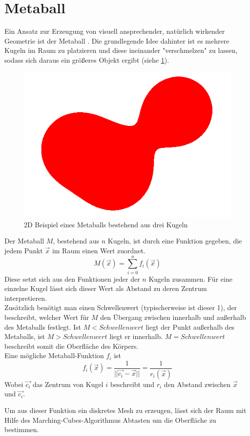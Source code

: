 \section{Metaball} \label{sec:metaball}
Ein Ansatz zur Erzeugung von visuell ansprechender, natürlich wirkender Geometrie ist der Metaball \cite{metaballArticle}.
Die grundlegende Idee dahinter ist es mehrere Kugeln im Raum zu platzieren und diese ineinander "verschmelzen"  zu lassen, sodass sich daraus ein größeres Objekt ergibt (siehe \ref{fig:2dMetaball}).

\begin{figure}[ht]
    \centering
    \includegraphics[width=0.5\linewidth]{chapters/02_Grundlagen/Metaball/metaball_2d}
    \caption{2D Beispiel eines Metaballs bestehend aus drei Kugeln}\label{fig:2dMetaball}
\end{figure}

Der Metaball $M$, bestehend aus $n$ Kugeln, ist durch eine Funktion gegeben, die jedem Punkt $\vec{x}$ im Raum einen Wert zuordnet.
\[M(\vec{x})=\sum_{i=0}^{n}f_i(\vec{x})\]
Diese setzt sich aus den Funktionen jeder der $n$ Kugeln zusammen. Für eine einzelne Kugel lässt sich dieser Wert als Abstand zu deren Zentrum interpretieren. \\
Zusätzlich benötigt man einen Schwellenwert (typischerweise ist dieser 1), der beschreibt, welcher Wert für $M$ den Übergang zwischen innerhalb und außerhalb des Metaballs festlegt.
Ist $M<Schwellenwert$ liegt der Punkt außerhalb des Metaballs, ist $M>Schwellenwert$ liegt er innerhalb. $M=Schwellenwert$ beschreibt somit die Oberfläche des Körpers.\\

Eine mögliche Metaball-Funktion $f_i$ ist
\[f_i(\vec{x}) = \frac{1}{||\vec{c_i}-\vec{x}||} = \frac{1}{r_i(\vec{x})}\]
Wobei $\vec{c_i}$ das Zentrum von Kugel $i$ beschreibt und $r_i$ den Abstand zwischen $\vec{x}$ und $\vec{c_i}$.

Um aus dieser Funktion ein diskretes Mesh zu erzeugen, lässt sich der Raum mit Hilfe des Marching-Cubes-Algorithmus Abtasten \cite{marching_cubes} um die Oberfläche zu bestimmen.
